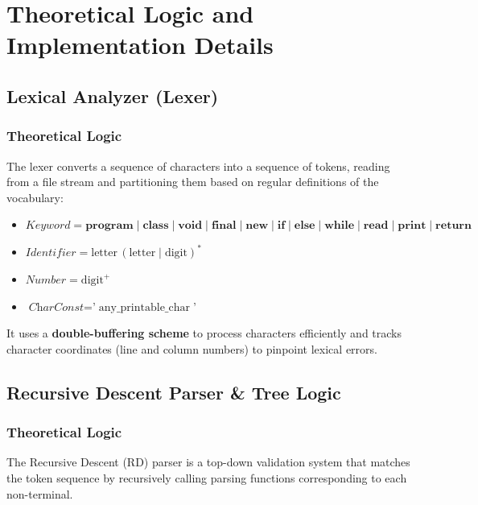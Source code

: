 \documentclass[11pt,a4paper]{article}
\begin{document}
\newpage
\section{Theoretical Logic and Implementation Details}

\subsection{Lexical Analyzer (Lexer)}

\subsubsection{Theoretical Logic}
The lexer converts a sequence of characters into a sequence of tokens, reading from a file stream and partitioning them based on regular definitions of the vocabulary:

\begin{itemize}
  \item $\textit{Keyword} = \mathbf{program} \mid \mathbf{class} \mid \mathbf{void} \mid \mathbf{final} \mid \mathbf{new} \mid \mathbf{if} \mid \mathbf{else} \mid \mathbf{while} \mid \mathbf{read} \mid \mathbf{print} \mid \mathbf{return}$
  \item $\textit{Identifier} = \text{letter}\,(\text{letter} \mid \text{digit})^*$
  \item $\textit{Number} = \text{digit}^+$
  \item $\textit{CharConst} = \texttt{'}\;\text{any\_printable\_char}\;\texttt{'}$
\end{itemize}

It uses a \textbf{double-buffering scheme} to process characters efficiently and tracks character coordinates (line and column numbers) to pinpoint lexical errors.

\subsection{Recursive Descent Parser \& Tree Logic}

\subsubsection{Theoretical Logic}
The Recursive Descent (RD) parser is a top-down validation system that matches the token sequence by recursively calling parsing functions corresponding to each non-terminal.
\end{document}
